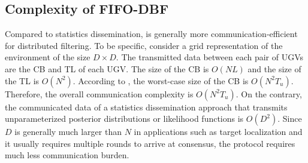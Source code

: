	
	
	
	\subsection{Complexity of FIFO-DBF}
	Compared to statistics dissemination, {\proto} is generally more communication-efficient for distributed filtering. 
	To be specific, consider a grid representation of the environment of the size $D\times D$. %
	The transmitted data between each pair of UGVs are the CB and TL of each UGV.
	The size of the CB is $O(NL)$ and the size of the TL is $O(N^2)$.
	According to , the worst-case size of the CB is $O(N^2T_u)$.
	Therefore, the overall communication complexity is $O(N^2T_u)$.	
	On the contrary, the communicated data of a statistics dissemination approach that transmits unparameterized posterior distributions or likelihood functions is $O(D^2)$.
	Since $D$ is generally much larger than $N$ in applications such as target localization and it usually requires multiple rounds to arrive at consensus, the {\proto} protocol requires much less communication burden.
	

